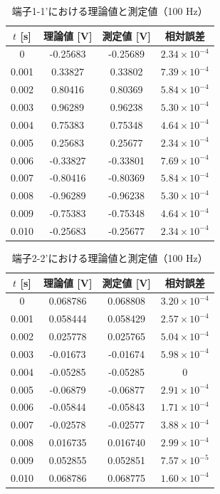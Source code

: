 \documentclass[article]{jlreq}
\begin{document}
\begin{table}[H]
\centering
\caption{端子1-1'における理論値と測定値（100 Hz）}
\begin{tabular}{cccc}
\toprule
$t$ [s] & 理論値 [V] & 測定値 [V] & 相対誤差 \\
\midrule
0     & -0.25683 & -0.25689 & $2.34\times10^{-4}$ \\
0.001 & 0.33827  & 0.33802  & $7.39\times10^{-4}$ \\
0.002 & 0.80416  & 0.80369  & $5.84\times10^{-4}$ \\
0.003 & 0.96289  & 0.96238  & $5.30\times10^{-4}$ \\
0.004 & 0.75383  & 0.75348  & $4.64\times10^{-4}$ \\
0.005 & 0.25683  & 0.25677  & $2.34\times10^{-4}$ \\
0.006 & -0.33827 & -0.33801 & $7.69\times10^{-4}$ \\
0.007 & -0.80416 & -0.80369 & $5.84\times10^{-4}$ \\
0.008 & -0.96289 & -0.96238 & $5.30\times10^{-4}$ \\
0.009 & -0.75383 & -0.75348 & $4.64\times10^{-4}$ \\
0.010 & -0.25683 & -0.25677 & $2.34\times10^{-4}$ \\
\bottomrule
\end{tabular}
\end{table}
\begin{table}[H]
\centering
\caption{端子2-2'における理論値と測定値（100 Hz）}
\begin{tabular}{cccc}
\toprule
$t$ [s] & 理論値 [V] & 測定値 [V] & 相対誤差 \\
\midrule
0     & 0.068786 & 0.068808 & $3.20\times10^{-4}$ \\
0.001 & 0.058444 & 0.058429 & $2.57\times10^{-4}$ \\
0.002 & 0.025778 & 0.025765 & $5.04\times10^{-4}$ \\
0.003 & -0.01673 & -0.01674 & $5.98\times10^{-4}$ \\
0.004 & -0.05285 & -0.05285 & $0$ \\
0.005 & -0.06879 & -0.06877 & $2.91\times10^{-4}$ \\
0.006 & -0.05844 & -0.05843 & $1.71\times10^{-4}$ \\
0.007 & -0.02578 & -0.02577 & $3.88\times10^{-4}$ \\
0.008 & 0.016735 & 0.016740 & $2.99\times10^{-4}$ \\
0.009 & 0.052855 & 0.052851 & $7.57\times10^{-5}$ \\
0.010 & 0.068786 & 0.068775 & $1.60\times10^{-4}$ \\
\bottomrule
\end{tabular}
\end{table}
\end{document}
